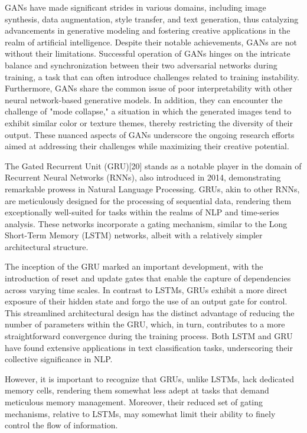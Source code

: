 \documentclass[fleqn,10pt]{thescipub} %
\begin{document}
GANs have made significant strides in various domains, including image synthesis, data augmentation, style transfer, and text generation, thus catalyzing advancements in generative modeling and fostering creative applications in the realm of artificial intelligence. Despite their notable achievements, GANs are not without their limitations. Successful operation of GANs hinges on the intricate balance and synchronization between their two adversarial networks during training, a task that can often introduce challenges related to training instability. Furthermore, GANs share the common issue of poor interpretability with other neural network-based generative models. In addition, they can encounter the challenge of "mode collapse," a situation in which the generated images tend to exhibit similar color or texture themes, thereby restricting the diversity of their output. These nuanced aspects of GANs underscore the ongoing research efforts aimed at addressing their challenges while maximizing their creative potential.


The Gated Recurrent Unit (GRU)[20] stands as a notable player in the domain of Recurrent Neural Networks (RNNs), also introduced in 2014, demonstrating remarkable prowess in Natural Language Processing. GRUs, akin to other RNNs, are meticulously designed for the processing of sequential data, rendering them exceptionally well-suited for tasks within the realms of NLP and time-series analysis. These networks incorporate a gating mechanism, similar to the Long Short-Term Memory (LSTM) networks, albeit with a relatively simpler architectural structure.


The inception of the GRU marked an important development, with the introduction of reset and update gates that enable the capture of dependencies across varying time scales. In contrast to LSTMs, GRUs exhibit a more direct exposure of their hidden state and forgo the use of an output gate for control. This streamlined architectural design has the distinct advantage of reducing the number of parameters within the GRU, which, in turn, contributes to a more straightforward convergence during the training process. Both LSTM and GRU have found extensive applications in text classification tasks, underscoring their collective significance in NLP.


However, it is important to recognize that GRUs, unlike LSTMs, lack dedicated memory cells, rendering them somewhat less adept at tasks that demand meticulous memory management. Moreover, their reduced set of gating mechanisms, relative to LSTMs, may somewhat limit their ability to finely control the flow of information. 
\end{document}
